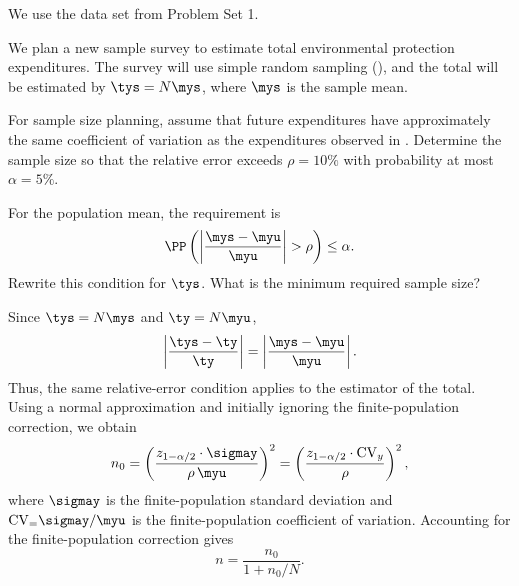 




\begin{Problem}\label{problem:sample_size}
We use the data set  from Problem Set 1.

\begin{Subtask}
    \item We plan a new sample survey to estimate total environmental
        protection expenditures. The survey will use simple random sampling
        (\SRS), and the total will be estimated by $\tys = N\mys$, where $\mys$
        is the sample mean.

        For sample size planning, assume that future expenditures have
        approximately the same coefficient of variation as the expenditures
        observed in . Determine the sample size so that the
        relative error exceeds $\rho = 10\%$ with probability at most $\alpha =
        5\%$.

        For the population mean, the requirement is
        \begin{equation*}
            \PP\left(\left\vert \frac{\mys - \myu}{\myu} \right\vert >
                \rho\right) \leq \alpha.
        \end{equation*}
        Rewrite this condition for $\tys$. What is the minimum required sample
        size?

    \begin{Solution}
        Since $\tys = N\mys$ and $\ty = N \myu$,
        \begin{equation*}
            \left\vert \frac{\tys - \ty}{\ty} \right\vert =
            \left\vert \frac{\mys - \myu}{\myu} \right\vert.
        \end{equation*}
        Thus, the same relative-error condition applies to the estimator of the
        total. Using a normal approximation and initially ignoring the
        finite-population correction, we obtain
        \begin{equation*}
            n_0 = \left(\frac{z_{1 - \alpha/2} \cdot
            \sigmay}{\rho\,\myu}\right)^2 = \left(\frac{z_{1 -
            \alpha/2}\cdot\mathrm{CV}_y}{\rho}\right)^2,
        \end{equation*}
        where $\sigmay$ is the finite-population standard deviation and
        $\mathrm{CV}_ = \sigmay/\myu$ is the finite-population coefficient of
        variation. Accounting for the finite-population correction gives
        \begin{equation*}
            n = \frac{n_0}{1 + n_0/N}.
        \end{equation*}


\end{Solution}
\end{Subtask}
\end{Problem}
